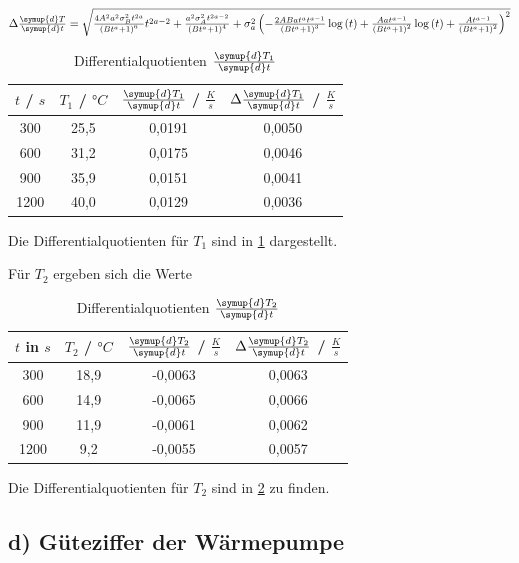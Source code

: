 $\Delta \frac{\symup{d}T}{\symup{d}t} = \sqrt{\frac{4 A^{2} a^{2} \sigma_{B}^{2} t^{2 a}}{\left(B t^{a} + 1\right)^{6}} t^{2 a - 2} + \frac{a^{2} \sigma_{A}^{2} t^{2 a - 2}}{\left(B t^{a} + 1\right)^{4}} + \sigma_{a}^{2} \left(- \frac{2 A B a t^{a} t^{a - 1}}{\left(B t^{a} + 1\right)^{3}} \log{\left (t \right )} + \frac{A a t^{a - 1}}{\left(B t^{a} + 1\right)^{2}} \log{\left (t \right )} + \frac{A t^{a - 1}}{\left(B t^{a} + 1\right)^{2}}\right)^{2}}$


\begin{table}
	\centering
	\caption{Differentialquotienten $\frac{\symup{d}T_1}{\symup{d}t}$ }
	\label{tab:diffT1}
\begin{tabular}{cccc}
	\toprule
	$t$ / $s$ & $T_1$ / $°C$ & $\frac{\symup{d}T_1}{\symup{d}t}$ / $\frac{K}{s}$ & $\Delta \frac{\symup{d}T_1}{\symup{d}t}$  / $\frac{K}{s}$ \\
	\midrule
	300 & 25,5 & 0,0191 & 0,0050 \\
	600 & 31,2 & 0,0175 & 0,0046 \\
	900 & 35,9 & 0,0151 & 0,0041 \\
	1200 & 40,0 & 0,0129 & 0,0036 \\
	\bottomrule
\end{tabular}
\end{table}

Die Differentialquotienten für  $T_1$ sind in \ref{tab:diffT1} dargestellt.

Für $T_2$ ergeben sich die Werte
\begin{table}
	\centering
	\caption{Differentialquotienten $\frac{\symup{d}T_2}{\symup{d}t}$} 
	\label{tab:diffT2}
\begin{tabular}{cccc}
	\toprule
	$t$ in $s$ & $T_2$ / $°C$ & $\frac{\symup{d}T_2}{\symup{d}t}$ / $\frac{K}{s}$ & $\Delta \frac{\symup{d}T_2}{\symup{d}t}$  / $\frac{K}{s}$ \\
	\midrule
	300 & 18,9 & -0,0063 & 0,0063 \\
	600 & 14,9 & -0,0065 & 0,0066 \\
	900 & 11,9 & -0,0061 & 0,0062 \\
	1200 & 9,2 & -0,0055 & 0,0057 \\
	\bottomrule
\end{tabular}
\end{table}

Die Differentialquotienten für $T_2$ sind in \ref{tab:diffT2} zu finden.

\newpage


\subsection{d) Güteziffer der Wärmepumpe}

